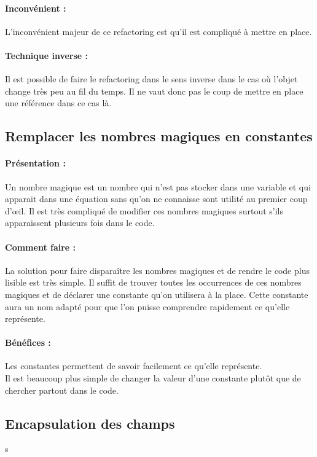 \documentclass[a4paper,twoside,12pt,openright]{report}
\begin{document}
\paragraph{Inconvénient :}
L'inconvénient majeur de ce refactoring est qu'il est compliqué à mettre en place.

\paragraph{Technique inverse :}
Il est possible de faire le refactoring dans le sens inverse dans le cas où l'objet change très peu au fil du temps. Il ne vaut donc pas le coup de mettre en place une référence dans ce cas là.

\subsection{Remplacer les nombres magiques en constantes}
\paragraph{Présentation :}
Un nombre magique est un nombre qui n'est pas stocker dans une variable et qui apparait dans une équation sans qu'on ne connaisse sont utilité au premier coup d'œil. Il est très compliqué de modifier ces nombres magiques surtout s'ils apparaissent plusieurs fois dans le code.

\paragraph{Comment faire :}
La solution pour faire disparaître les nombres magiques et de rendre le code plus lisible est très simple. Il suffit de trouver toutes les occurrences de ces nombres magiques et de déclarer une constante qu'on utilisera à la place. Cette constante aura un nom adapté pour que l'on puisse comprendre rapidement ce qu'elle représente.

\paragraph{Bénéfices :}
Les constantes permettent de savoir facilement ce qu'elle représente.\\
Il est beaucoup plus simple de changer la valeur d'une constante plutôt que de chercher partout dans le code.



\subsection{Encapsulation des champs}
s
\end{document}
